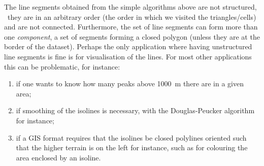 The line segments obtained from the simple algorithms above are not structured, \ie\ they are in an arbitrary order (the order in which we visited the triangles/cells) and are not connected.
Furthermore, the set of line segments can form more than one \emph{component}, a set of segments forming a closed polygon (unless they are at the border of the dataset).
Perhaps the only application where having unstructured line segments is fine is for visualisation of the lines.
For most other applications this can be problematic, for instance:
\begin{enumerate}
  \item if one wants to know how many peaks above \qty{1000}{\m} there are in a given area;
  \item if smoothing of the isolines is necessary, with the Douglas-Peucker algorithm for instance;
  \item if a GIS format requires that the isolines be closed polylines oriented such that the higher terrain is on the left for instance, such as for colouring the area enclosed by an isoline.
\end{enumerate}

%

